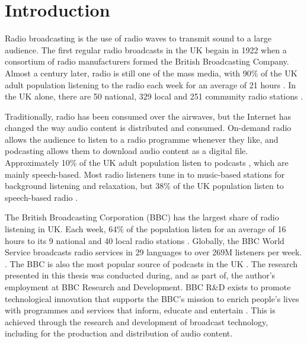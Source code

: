 \chapter{Introduction}\label{chp:intro}

Radio broadcasting is the use of radio waves to transmit sound to a large audience.  The first regular radio broadcasts
in the UK begain in 1922 when a consortium of radio manufacturers formed the British Broadcasting Company.
Almost a century later, radio is still one of the mass media, with 90\% of the UK adult population listening to the
radio each week for an average of 21 hours \citep{RAJAR2017a}.  In the UK alone, there are 50 national, 329 local and
251 community radio stations \citep[pp. 6, 127]{Ofcom2017}.

Traditionally, radio has been consumed over the airwaves, but the Internet has changed the way audio content is
distributed and consumed.  On-demand radio allows the audience to listen to a radio programme whenever they like, and
podcasting allows them to download audio content as a digital file.  Approximately 10\% of the UK adult population
listen to podcasts \citep{RAJAR2017}, which are mainly speech-based.  Most radio listeners tune in to music-based
stations for background listening and relaxation, but 38\% of the UK population listen to speech-based radio
\citep[pp.  97, 105]{Ofcom2017}.

The British Broadcasting Corporation (BBC) has the largest share of radio listening in UK. Each week, 64\% of the
population listen for an average of 16 hours to its 9 national and 40 local radio stations \citep{RAJAR2017a}.
Globally, the BBC World Service broadcasts radio services in 29 languages to over 269M listeners per week. 
\citep{BBC2017}. The BBC is also the most popular source of podcasts in the UK \citep[p. 107]{Ofcom2017}.
The research presented in this thesis was conducted during, and as part of, the author's employment at BBC Research and
Development.  BBC R\&D exists to promote technological innovation that supports the BBC's mission to enrich people's
lives with programmes and services that inform, educate and entertain \citep[art. 15]{BBCCharter2016}.  This is
achieved through the research and development of broadcast technology, including for the production and distribution of
audio content.

